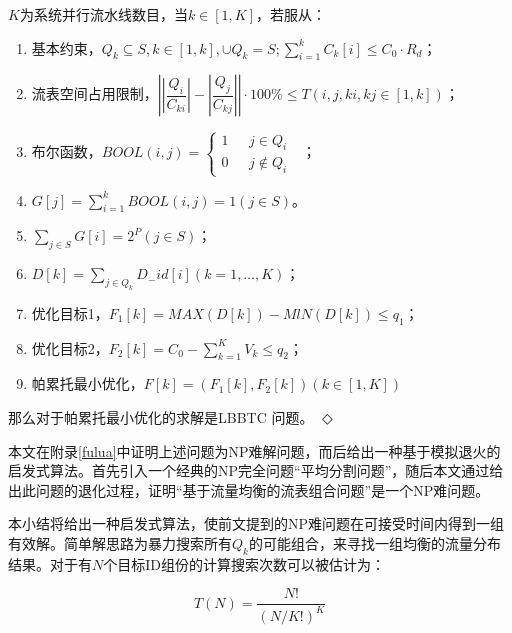 \begin{definition}[LBBTC]
	$K$为系统并行流水线数目，当$k\in [1,K]$，若服从：
	\begin{enumerate}
		\item 基本约束，$Q_{k}\subseteq S, k\in \left[ 1,k\right],\cup Q_{k}=S;\sum ^{k}_{i=1}C_{k}\left[ i\right] \leq C_{0}\cdot R_{d} $；
		\item 流表空间占用限制，$\left| \left| \dfrac {Q_{i}}{C_{ki}}\right| -\left| \dfrac {Q_{j}}{C_{kj}}\right| \right|\cdot 100\%\leq T\left( i, j, ki, kj\in \left[ 1,k\right] \right) $；
		\item 布尔函数，$ BOOL\left(i,j\right)=
		\begin{cases}
		1& \text{ $j \in Q_i$ }\\
		0& \text{ $j \notin Q_i$}
		\end{cases}$；
		\item $G\left[ j\right] =\sum ^{k}_{i=1}BOOL\left( i,j\right) =1\left( j\in S\right)  $。
		\item $\sum _{j\in S}G\left[ i\right] =2^{P}\left( j\in S\right)  $；
		\item $D\left[ k\right] =\sum _{j\in Q_{k}}D_{-}id\left[ i\right] \left( k=1,\ldots ,K\right)  $；
		\item 优化目标1，$ F_{1}\left[ k\right] =MAX\left( D\left[ k\right] \right) -MlN\left( D\left[ k\right] \right) \leq q_1$；
		\item 优化目标2，$ F_{2}\left[ k\right] =C_{0}-\sum ^{K}_{k=1}V_{k}\leq q_{2}$；
		\item 帕累托最小优化，$ F\left[ k\right] =\left( F_{1}\left[ k\right] ,F_{2}\left[ k\right] \right) \left( k\in \left[ 1,K\right] \right)  $
	\end{enumerate}
	那么对于帕累托最小优化的求解是{\hei LBBTC} 问题。 \qquad \qquad \qquad \qquad \qquad \qquad \qquad $\Diamond$
\end{definition}


本文在附录\ref{fulua}中证明上述问题为NP难解问题，而后给出一种基于模拟退火的启发式算法。首先引入一个经典的NP完全问题“平均分割问题”，随后本文通过给出此问题的退化过程，证明“基于流量均衡的流表组合问题”是一个NP难问题。



本小结将给出一种启发式算法，使前文提到的NP难问题在可接受时间内得到一组有效解。简单解思路为暴力搜索所有$Q_k$的可能组合，来寻找一组均衡的流量分布结果。对于有$N$个目标ID组份的计算搜索次数可以被估计为：

\begin{equation}
	T(N)=\dfrac{N!}{(N/K!)^K}
\end{equation}

